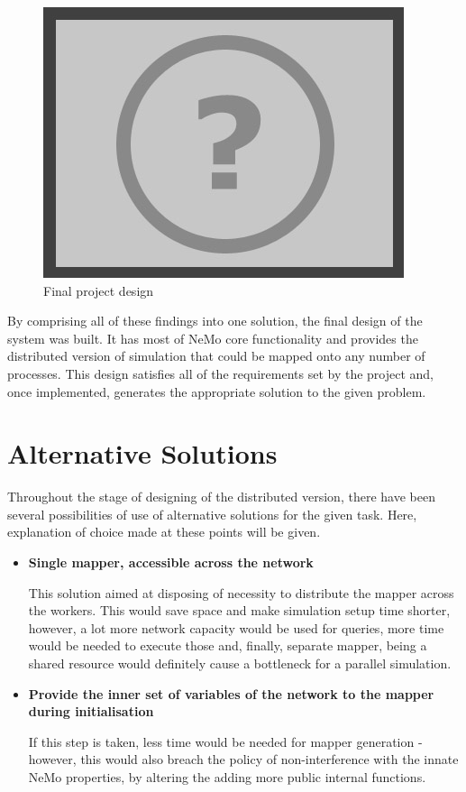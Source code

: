 \begin{figure}[h]
\begin{center}
\includegraphics[scale = 1]{images/placeholder.png}
\end{center}
\caption{Final project design}
\end{figure}

By comprising all of these findings into one solution, the final design of the system was built. It has most of NeMo core functionality and provides the distributed version of simulation that could be mapped onto any number of processes. This design satisfies all of the requirements set by the project and, once implemented, generates the appropriate solution to the given problem.

\clearpage

\section{Alternative Solutions}

Throughout the stage of designing of the distributed version, there have been several possibilities of use of alternative solutions for the given task. Here, explanation of choice made at these points will be given.

\begin{itemize}

\item{\textbf{Single mapper, accessible across the network}}

This solution aimed at disposing of necessity to distribute the mapper across the workers. This would save space and make simulation setup time shorter, however, a lot more network capacity would be used for queries, more time would be needed to execute those and, finally, separate mapper, being a shared resource would definitely cause a bottleneck for a parallel simulation.

\item{\textbf{Provide the inner set of variables of the network to the mapper during initialisation}}

If this step is taken, less time would be needed for mapper generation - however, this would also breach the policy of non-interference with the innate NeMo properties, by altering the adding more public internal functions.

\end{itemize}
